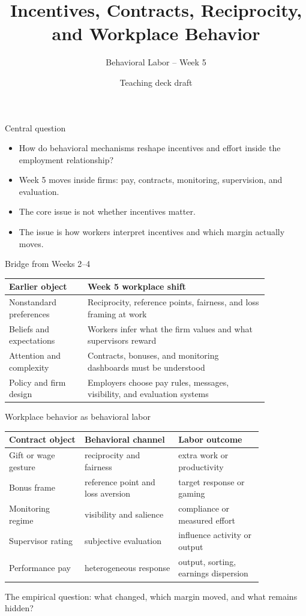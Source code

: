 \documentclass[aspectratio=169,11pt]{beamer}
\title{Incentives, Contracts, Reciprocity, and Workplace Behavior}
\subtitle{Behavioral Labor -- Week 5}
\author{Teaching deck draft}
\date{}
\begin{document}
\begin{frame}
  \titlepage
\end{frame}

\begin{frame}{Central question}
\begin{itemize}
    \item How do behavioral mechanisms reshape incentives and effort inside the employment relationship?
    \item Week 5 moves inside firms: pay, contracts, monitoring, supervision, and evaluation.
    \item The core issue is not whether incentives matter.
    \item The issue is how workers interpret incentives and which margin actually moves.
\end{itemize}
\end{frame}

\begin{frame}{Bridge from Weeks 2--4}
\small
\begin{tabular}{p{0.26\linewidth} p{0.60\linewidth}}
\toprule
Earlier object & Week 5 workplace shift \\
\midrule
Nonstandard preferences & Reciprocity, reference points, fairness, and loss framing at work \\
Beliefs and expectations & Workers infer what the firm values and what supervisors reward \\
Attention and complexity & Contracts, bonuses, and monitoring dashboards must be understood \\
Policy and firm design & Employers choose pay rules, messages, visibility, and evaluation systems \\
\bottomrule
\end{tabular}
\end{frame}

\begin{frame}{Workplace behavior as behavioral labor}
\small
\begin{tabular}{p{0.25\linewidth} p{0.31\linewidth} p{0.28\linewidth}}
\toprule
Contract object & Behavioral channel & Labor outcome \\
\midrule
Gift or wage gesture & reciprocity and fairness & extra work or productivity \\
Bonus frame & reference point and loss aversion & target response or gaming \\
Monitoring regime & visibility and salience & compliance or measured effort \\
Supervisor rating & subjective evaluation & influence activity or output \\
Performance pay & heterogeneous response & output, sorting, earnings dispersion \\
\bottomrule
\end{tabular}

\vspace{0.6em}
The empirical question: what changed, which margin moved, and what remains hidden?
\end{frame}
\end{document}
